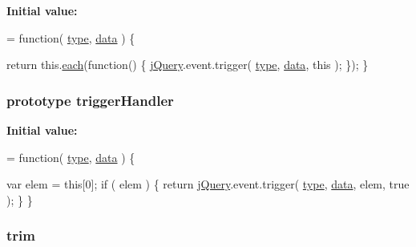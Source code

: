 {\bfseries Initial value\-:}
\begin{DoxyCode}
= \textcolor{keyword}{function}( \hyperlink{jquery-1_810_82-vsdoc_8js_a3940565e83a9bfd10d95ffd27536da91}{type}, \hyperlink{jquery-1_810_82-vsdoc_8js_a609407b3456fdc3c5671a9fc4a226ff7}{data} ) \{


        \textcolor{keywordflow}{return} this.\hyperlink{jquery-1_810_82-vsdoc_8js_aae0bcb6b00035445a8f9b262c96ea8a2}{each}(\textcolor{keyword}{function}() \{
            \hyperlink{jquery-1_810_82-vsdoc_8js_add5237586d970a38a81f990e8eb28c6c}{jQuery}.event.trigger( \hyperlink{jquery-1_810_82-vsdoc_8js_a3940565e83a9bfd10d95ffd27536da91}{type}, \hyperlink{jquery-1_810_82-vsdoc_8js_a609407b3456fdc3c5671a9fc4a226ff7}{data}, \textcolor{keyword}{this} );
        \});
    \}
\end{DoxyCode}
\hypertarget{jquery-1_810_82-vsdoc_8js_afe18935b86e978c91a4ae291ad8825c8}{
\subsubsection[{trigger\-Handler}]{ {\bf prototype} trigger\-Handler}}\label{jquery-1_810_82-vsdoc_8js_afe18935b86e978c91a4ae291ad8825c8}
{\bfseries Initial value\-:}
\begin{DoxyCode}
= \textcolor{keyword}{function}( \hyperlink{jquery-1_810_82-vsdoc_8js_a3940565e83a9bfd10d95ffd27536da91}{type}, \hyperlink{jquery-1_810_82-vsdoc_8js_a609407b3456fdc3c5671a9fc4a226ff7}{data} ) \{


        var elem = \textcolor{keyword}{this}[0];
        \textcolor{keywordflow}{if} ( elem ) \{
            \textcolor{keywordflow}{return} \hyperlink{jquery-1_810_82-vsdoc_8js_add5237586d970a38a81f990e8eb28c6c}{jQuery}.event.trigger( \hyperlink{jquery-1_810_82-vsdoc_8js_a3940565e83a9bfd10d95ffd27536da91}{type}, \hyperlink{jquery-1_810_82-vsdoc_8js_a609407b3456fdc3c5671a9fc4a226ff7}{data}, elem, \textcolor{keyword}{true} );
        \}
    \}
\end{DoxyCode}
\hypertarget{jquery-1_810_82-vsdoc_8js_a5c6bdf61ecee84c4d51137801d3fac85}{
\subsubsection[{trim}]{ trim}}\label{jquery-1_810_82-vsdoc_8js_a5c6bdf61ecee84c4d51137801d3fac85}
